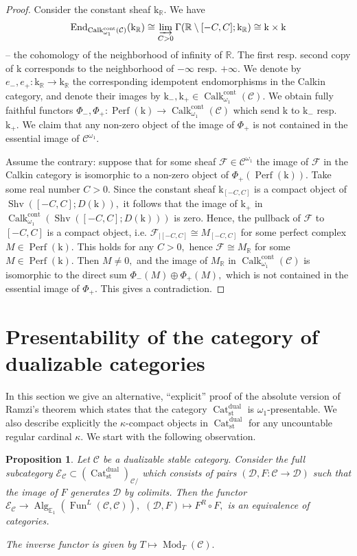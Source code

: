 \documentclass[11pt,leqno]{amsart}
\newtheorem{prop}[theo]{Proposition}
\numberwithin{equation}{section}
\def\R{\mathbb{R}}
\def\End{\operatorname{End}}
\newcommand{\indlim}[1][]{\mathop{\varinjlim}\limits_{#1}}
\newcommand{\Cat}{\operatorname{Cat}}
\newcommand{\cont}{\operatorname{cont}}
\newcommand{\st}{\operatorname{st}}
\newcommand{\dual}{\operatorname{dual}}
\newcommand{\bE}{{\mathbb E}}
\newcommand{\mk}{\mathrm k}
\newcommand{\cF}{{\mathcal F}}
\newcommand{\cD}{{\mathcal D}}
\newcommand{\cC}{{\mathcal C}}
\newcommand{\cE}{{\mathcal E}}
\newcommand{\Fun}{\operatorname{Fun}}
\newcommand{\Perf}{\operatorname{Perf}}
\newcommand{\Sh}{\operatorname{Shv}}
\newcommand{\Calk}{\operatorname{Calk}}
\newcommand{\Alg}{\operatorname{Alg}}
\newcommand{\Mod}{\operatorname{Mod}}
\begin{document}
\begin{proof}Consider the constant sheaf $\mk_{\R}.$ We have
$$\End_{\Calk_{\omega_1}^{\cont}(\cC)}(\mk_{\R})\cong \indlim[C>0]\Gamma(\R\setminus [-C,C];\mk_{\R})\cong \mk\times \mk$$ -- the cohomology of the neighborhood of infinity of $\R.$ The first resp. second copy of $\mk$ corresponds to the neighborhood of $-\infty$ resp. $+\infty.$ We denote by $e_-,e_+:\mk_{\R}\to\mk_{\R}$ the corresponding idempotent endomorphisms in the Calkin category, and denote their images by $\mk_-,\mk_+\in\Calk_{\omega_1}^{\cont}(\cC).$ We obtain fully faithful functors $\Phi_-,\Phi_+:\Perf(\mk)\to \Calk_{\omega_1}^{\cont}(\cC)$ which send $\mk$ to $\mk_-$ resp. $\mk_+.$ We claim that any non-zero object of the image of $\Phi_+$ is not contained in the essential image of $\cC^{\omega_1}.$

Assume the contrary: suppose that for some sheaf $\cF\in\cC^{\omega_1}$ the image of $\cF$ in the Calkin category is isomorphic to a non-zero object of $\Phi_+(\Perf(\mk)).$ Take some real number $C>0.$ Since the constant sheaf $\mk_{[-C,C]}$ is a compact object of $\Sh([-C,C];D(\mk)),$ it follows that the image of $\mk_+$ in $\Calk_{\omega_1}^{\cont}(\Sh([-C,C];D(\mk)))$ is zero. Hence, the pullback of $\cF$ to $[-C,C]$ is a compact object, i.e. $\cF_{\mid [-C,C]}\cong M_{[-C,C]}$ for some perfect complex $M\in\Perf(\mk).$ This holds for any $C>0,$ hence $\cF\cong M_{\R}$ for some $M\in\Perf(\mk).$ Then $M\ne 0,$ and the image of $M_{\R}$ in $\Calk_{\omega_1}^{\cont}(\cC)$ is isomorphic to the direct sum $\Phi_-(M)\oplus \Phi_+(M),$ which is not contained in the essential image of $\Phi_+.$ This gives a contradiction.\end{proof}

\section{Presentability of the category of dualizable categories}
\label{app:presentability_Cat_dual}

In this section we give an alternative, ``explicit'' proof of the absolute version of Ramzi's theorem \cite{Ram24a} which states that the category $\Cat_{\st}^{\dual}$ is $\omega_1$-presentable. We also describe explicitly the $\kappa$-compact objects in $\Cat_{\st}^{\dual}$ for any uncountable regular cardinal $\kappa.$ We start with the following observation.

\begin{prop}\label{prop:categories_under_C_and_monads} Let $\cC$ be a dualizable stable category. Consider the full subcategory $\cE_{\cC}\subset (\Cat_{\st}^{\dual})_{\cC/}$ which consists of pairs $(\cD,F:\cC\to\cD)$ such that the image of $F$ generates $\cD$ by colimits. Then the functor $\cE_{\cC}\to \Alg_{\bE_1}(\Fun^{L}(\cC,\cC)),$ $(\cD,F)\mapsto F^R\circ F,$ is an equivalence of categories.

The inverse functor is given by $T\mapsto \Mod_T(\cC).$\end{prop} 
\end{document}
